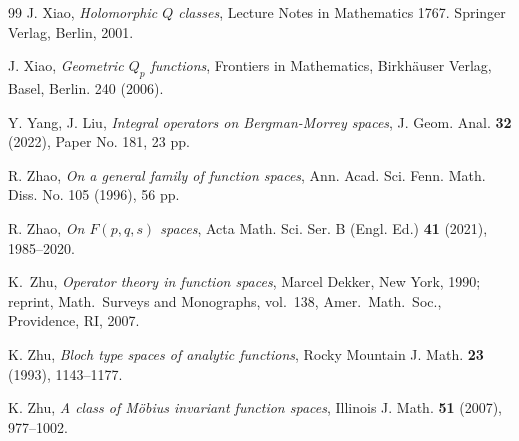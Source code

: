 \documentclass[12pt, reqno]{amsart}
\begin{document}
\begin{thebibliography}{99}
 J. Xiao,  
\textit{Holomorphic $Q$ classes},
Lecture Notes in Mathematics 1767. Springer Verlag, Berlin, 2001.

 J. Xiao, 
{\it Geometric $Q_p$ functions},
Frontiers in Mathematics, Birkh\"auser Verlag, Basel, Berlin. 240 (2006).

 Y. Yang,  J. Liu,
\textit{ Integral operators on Bergman-Morrey spaces},
J. Geom. Anal. \textbf{32} (2022), Paper No. 181, 23 pp.

 R. Zhao, 
\textit{On a general family of function spaces},
Ann. Acad. Sci. Fenn. Math. Diss. No. 105 (1996), 56 pp.

 R. Zhao, 
\textit{On \({F}(p, q, s)\) spaces},
Acta Math. Sci. Ser. B (Engl. Ed.)
\textbf{41} (2021), 1985--2020.

 K.~Zhu,
\textit{Operator theory in function spaces},
Marcel Dekker, New York, 1990; reprint, Math.~Surveys and Monographs, vol.~138, Amer.~Math.~Soc., Providence, RI, 2007.

 K. Zhu,
\textit{Bloch type spaces of analytic functions},
Rocky Mountain J. Math. \textbf{23} (1993), 1143--1177.

 K. Zhu,
\textit{A class of M\"obius invariant function spaces},
Illinois J. Math. \textbf{51} (2007), 977--1002. 

\end{thebibliography}
\end{document}
